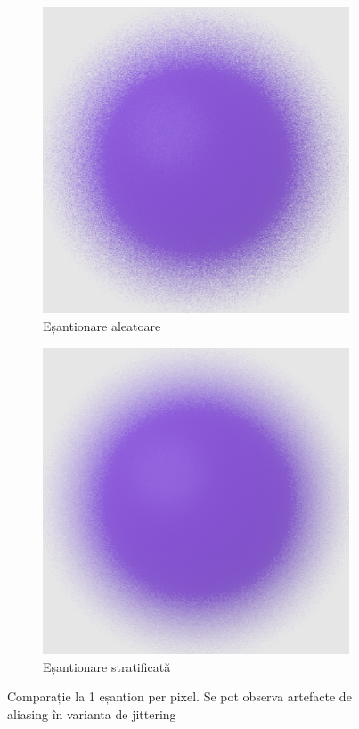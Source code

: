 \documentclass[12pt,a4paper]{report}
\numberwithin{equation}{section} %
\begin{document}
\begin{figure}[ht]
	\centering
	\begin{subfigure}[h]{0.45\linewidth}
		\centering
		\includegraphics[width=\linewidth]{pics/random-circle.png}
		\caption{Eșantionare aleatoare}
	\end{subfigure}
	\hfill
	\begin{subfigure}[h]{0.45\linewidth}
		\centering
		\includegraphics[width=\linewidth]{pics/stratified-circle.png}
		\caption{Eșantionare stratificată}
	\end{subfigure}
	\caption{Comparație la 1 eșantion per pixel. Se pot observa artefacte de aliasing în varianta de jittering\protect{}}
	\label{fig:uniform_aliasing}
\end{figure}
\end{document}
